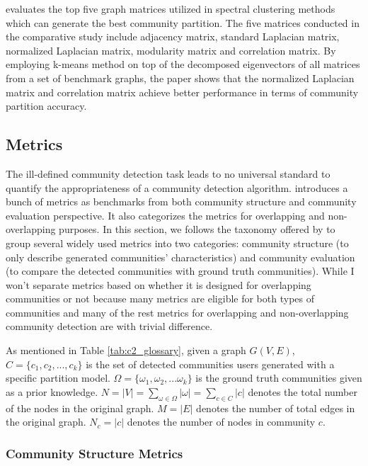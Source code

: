 \cite{shen2010spectral} evaluates the top five graph matrices utilized in spectral clustering methods which can generate the best community partition.  The five matrices conducted in the comparative study include adjacency matrix, standard Laplacian matrix, normalized Laplacian matrix,
modularity matrix and correlation matrix. By employing k-means method on top of the decomposed eigenvectors of all matrices from a set of benchmark graphs, the paper shows that the normalized Laplacian matrix and correlation matrix achieve better performance in terms of community partition accuracy. 

\subsection{Metrics}  

The ill-defined community detection task leads to no universal standard to quantify the appropriateness of a community detection algorithm. \cite{chakraborty2017metrics} introduces a bunch of metrics as benchmarks from both community structure and community evaluation perspective. It also categorizes the metrics for overlapping and non-overlapping purposes.  In this section, we follows the taxonomy offered by \cite{chakraborty2017metrics} to group several widely used metrics into two categories: community structure (to only describe generated communities' characteristics) and community evaluation (to compare the detected communities with ground truth communities). While I won't separate metrics based on whether it is designed for overlapping communities or not because many metrics are eligible for both types of communities and many of the rest metrics for overlapping and non-overlapping community detection are with trivial difference. 

As mentioned in Table \ref{tab:c2_glossary}, given a graph $G(V,E)$, $C = \{c_{1},c_{2},...,c_{k}\}$ is the set of detected communities users generated with a specific partition model. $\Omega = \{\omega_{1},\omega_{2},...\omega_{k}\}$ is the ground truth communities given as a prior knowledge. $N = |V| = \sum_{\omega \in \Omega}|\omega|= \sum_{c \in C}|c|$  denotes the total number of the nodes in the original graph. $M= |E|$ denotes the number of total edges in the original graph. $N_{c} = |c|$ denotes the number of nodes in community $c$.

\subsubsection{Community Structure Metrics}

